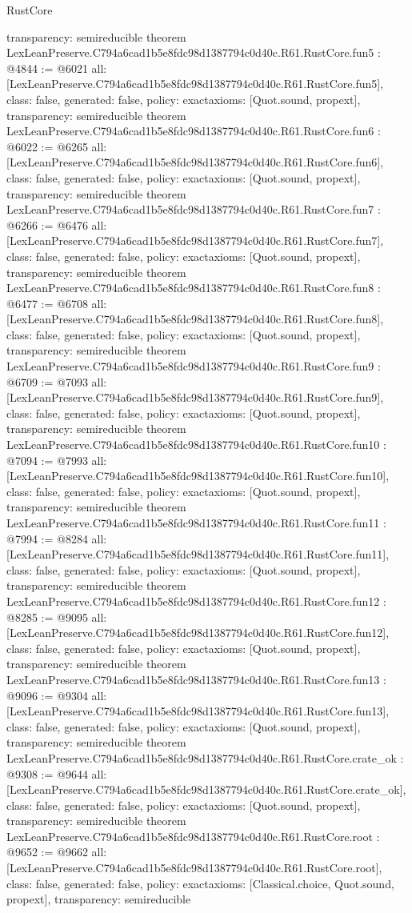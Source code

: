 \begin{lexlean}{RustCore}
\begin{coremodule}
{  transparency: semireducible
}
theorem LexLeanPreserve.C794a6cad1b5e8fdc98d1387794c0d40c.R61.RustCore.fun5 : @4844 := @6021 {
  all: [LexLeanPreserve.C794a6cad1b5e8fdc98d1387794c0d40c.R61.RustCore.fun5],
  class: false,
  generated: false,
  policy: exact{axioms: [Quot.sound, propext]},
  transparency: semireducible
}
theorem LexLeanPreserve.C794a6cad1b5e8fdc98d1387794c0d40c.R61.RustCore.fun6 : @6022 := @6265 {
  all: [LexLeanPreserve.C794a6cad1b5e8fdc98d1387794c0d40c.R61.RustCore.fun6],
  class: false,
  generated: false,
  policy: exact{axioms: [Quot.sound, propext]},
  transparency: semireducible
}
theorem LexLeanPreserve.C794a6cad1b5e8fdc98d1387794c0d40c.R61.RustCore.fun7 : @6266 := @6476 {
  all: [LexLeanPreserve.C794a6cad1b5e8fdc98d1387794c0d40c.R61.RustCore.fun7],
  class: false,
  generated: false,
  policy: exact{axioms: [Quot.sound, propext]},
  transparency: semireducible
}
theorem LexLeanPreserve.C794a6cad1b5e8fdc98d1387794c0d40c.R61.RustCore.fun8 : @6477 := @6708 {
  all: [LexLeanPreserve.C794a6cad1b5e8fdc98d1387794c0d40c.R61.RustCore.fun8],
  class: false,
  generated: false,
  policy: exact{axioms: [Quot.sound, propext]},
  transparency: semireducible
}
theorem LexLeanPreserve.C794a6cad1b5e8fdc98d1387794c0d40c.R61.RustCore.fun9 : @6709 := @7093 {
  all: [LexLeanPreserve.C794a6cad1b5e8fdc98d1387794c0d40c.R61.RustCore.fun9],
  class: false,
  generated: false,
  policy: exact{axioms: [Quot.sound, propext]},
  transparency: semireducible
}
theorem LexLeanPreserve.C794a6cad1b5e8fdc98d1387794c0d40c.R61.RustCore.fun10 : @7094 := @7993 {
  all: [LexLeanPreserve.C794a6cad1b5e8fdc98d1387794c0d40c.R61.RustCore.fun10],
  class: false,
  generated: false,
  policy: exact{axioms: [Quot.sound, propext]},
  transparency: semireducible
}
theorem LexLeanPreserve.C794a6cad1b5e8fdc98d1387794c0d40c.R61.RustCore.fun11 : @7994 := @8284 {
  all: [LexLeanPreserve.C794a6cad1b5e8fdc98d1387794c0d40c.R61.RustCore.fun11],
  class: false,
  generated: false,
  policy: exact{axioms: [Quot.sound, propext]},
  transparency: semireducible
}
theorem LexLeanPreserve.C794a6cad1b5e8fdc98d1387794c0d40c.R61.RustCore.fun12 : @8285 := @9095 {
  all: [LexLeanPreserve.C794a6cad1b5e8fdc98d1387794c0d40c.R61.RustCore.fun12],
  class: false,
  generated: false,
  policy: exact{axioms: [Quot.sound, propext]},
  transparency: semireducible
}
theorem LexLeanPreserve.C794a6cad1b5e8fdc98d1387794c0d40c.R61.RustCore.fun13 : @9096 := @9304 {
  all: [LexLeanPreserve.C794a6cad1b5e8fdc98d1387794c0d40c.R61.RustCore.fun13],
  class: false,
  generated: false,
  policy: exact{axioms: [Quot.sound, propext]},
  transparency: semireducible
}
theorem LexLeanPreserve.C794a6cad1b5e8fdc98d1387794c0d40c.R61.RustCore.crate_ok : @9308 := @9644 {
  all: [LexLeanPreserve.C794a6cad1b5e8fdc98d1387794c0d40c.R61.RustCore.crate_ok],
  class: false,
  generated: false,
  policy: exact{axioms: [Quot.sound, propext]},
  transparency: semireducible
}
theorem LexLeanPreserve.C794a6cad1b5e8fdc98d1387794c0d40c.R61.RustCore.root : @9652 := @9662 {
  all: [LexLeanPreserve.C794a6cad1b5e8fdc98d1387794c0d40c.R61.RustCore.root],
  class: false,
  generated: false,
  policy: exact{axioms: [Classical.choice, Quot.sound, propext]},
  transparency: semireducible
}


\end{coremodule}
\end{lexlean}
